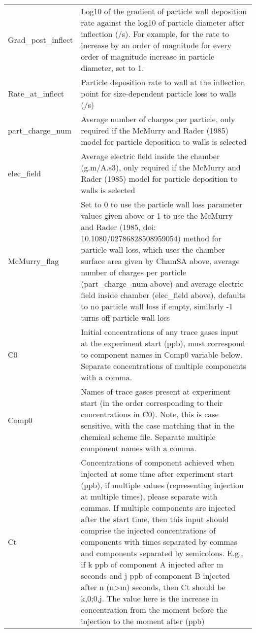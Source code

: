 \documentclass[gmd, manuscript]{copernicus}
\begin{document}
\begin{center}
\begin{supertabular}{p{0.15\textwidth}p{0.75\textwidth}}
Grad\_post\_inflect & Log10 of the gradient of particle wall deposition rate against the log10 of particle diameter after inflection (/s).  For example, for the rate to increase by an order of magnitude for every order of magnitude increase in particle diameter, set to 1.\\

Rate\_at\_inflect & Particle deposition rate to wall at the inflection point for size-dependent particle loss to walls (/s)\\

part\_charge\_num & Average number of charges per particle, only required if the McMurry and Rader (1985) model for particle deposition to walls is selected\\

elec\_field & Average electric field inside the chamber (g.m/A.s3), only required if the McMurry and Rader (1985) model for particle deposition to walls is selected\\

McMurry\_flag & Set to 0 to use the particle wall loss parameter values given above or 1 to use the McMurry and Rader (1985, doi: 10.1080/02786828508959054) method for particle wall loss, which uses the chamber surface area given by ChamSA above, average number of charges per particle (part\_charge\_num above) and average electric field inside chamber (elec\_field above), defaults to no particle wall loss if empty, similarly -1 turns off particle wall loss\\

C0 & Initial concentrations of any trace gases input at the experiment start (ppb), must correspond to component names in Comp0 variable below.  Separate concentrations of multiple components with a comma.  \\

Comp0 & Names of trace gases present at experiment start (in the order corresponding to their concentrations in C0).  Note, this is case sensitive, with the case matching that in the chemical scheme file.  Separate multiple component names with a comma. \\

Ct & Concentrations of component achieved when injected at some time after experiment start (ppb), if multiple values (representing injection at multiple times), please separate with commas.  If multiple components are  injected after the start time, then this input should comprise the injected concentrations of components with times separated by commas and components separated by semicolons.  E.g., if k ppb of component A injected after m seconds and j ppb of component B injected after n (n>m) seconds, then Ct should be k,0;0,j.  The value here is the increase in concentration from the moment before the injection to the moment after (ppb) \\


\end{supertabular}
\end{center}
\end{document}
